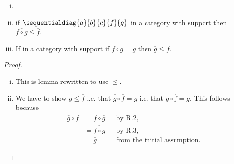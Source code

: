 

\begin{lemma}
\begin{enumerate}[(i)]
\item \item
if $\sequentialdiag{a}{b}{c}{f}{g}$ in a category with support
then $\overline{f \circ g} \leq \overline{f}$.
\item If \fgsourcediag in a category with support
if $\overline{f} \circ g = g$ 
then $\overline{g} \leq \overline{f}$.
\end{enumerate}
\end{lemma}
\begin{proof}
\begin{enumerate}[(i)]
\item This is lemma  rewritten to use $\leq$.
\item We have to show $\overline{g} \leq \overline{f}$ i.e. that $\overline{\overline{g}} \circ \overline{f} = \overline{g}$
i.e. that $\overline{g} \circ \overline{f} = \overline{g}$. This follows because
\begin{align*}
\overline{g} \circ \overline{f} &= \overline{f} \circ \overline{g} &&\mbox{by R.2,} \\
                      &= \overline{\overline{f} \circ g} && \mbox{by R.3,} \\
                      &= \overline{g} &&\mbox{from the initial assumption.}
\end{align*}
\end{enumerate}
\end{proof}

